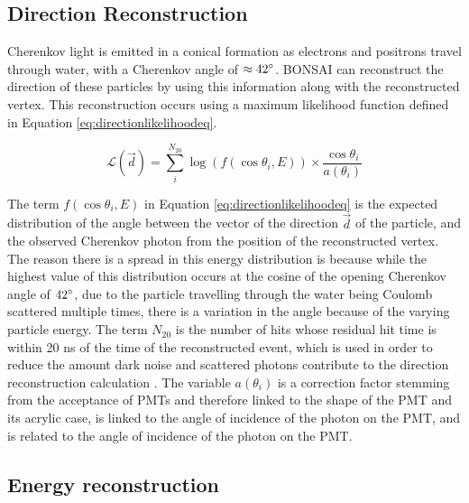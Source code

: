 \subsection{Direction Reconstruction}

Cherenkov light is emitted in a conical formation as electrons and positrons travel through water, with a Cherenkov angle of $\approx 42\degree$. BONSAI can reconstruct the direction of these particles by using this information along with the reconstructed vertex. This reconstruction occurs using a maximum likelihood function defined in Equation \ref{eq:directionlikelihoodeq}.

\begin{equation}
    \mathcal{L}(\vec{d})=\sum_{i}^{N_{20}} \log (f(\cos\theta_{i}, E))\times\frac{\cos\theta_{i}}{a(\theta_{i})}
    \label{eq:directionlikelihoodeq}
\end{equation}

The term $f(\cos\theta_{i},E)$ in Equation \ref{eq:directionlikelihoodeq} is the expected distribution of the angle between the vector of the direction $\vec{d}$ of the particle, and the observed Cherenkov photon from the position of the reconstructed vertex. The reason there is a spread in this energy distribution is because while the highest value of this distribution occurs at the cosine of the opening Cherenkov angle of $42\degree$, due to the particle travelling through the water being Coulomb scattered multiple times, there is a variation in the angle because of the varying particle energy. The term $N_{20}$ is the number of hits whose residual hit time is within 20 ns of the time of the reconstructed event, which is used in order to reduce the amount dark noise and scattered photons contribute to the direction reconstruction calculation \cite{shiozawa1999reconstruction}. The variable $a(\theta_{i})$ is a correction factor stemming from the acceptance of PMTs and therefore linked to the shape of the PMT and its acrylic case, is linked to the angle of incidence of the photon on the PMT, and is related to the angle of incidence of the photon on the PMT.


\subsection{Energy reconstruction}

